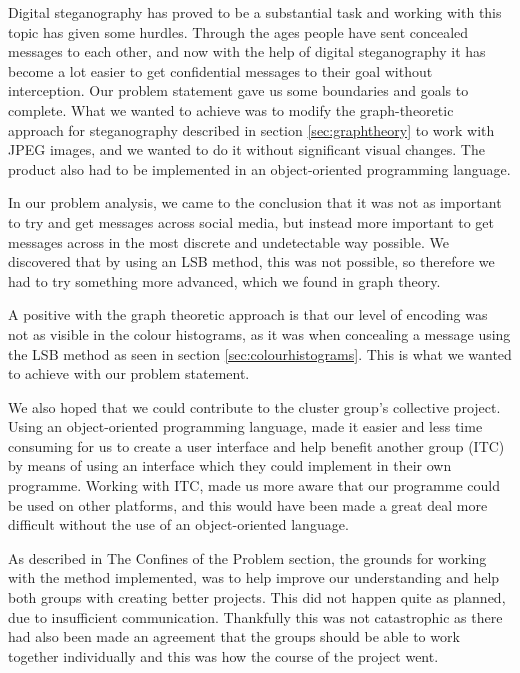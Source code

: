 Digital steganography has proved to be a substantial task and working with this topic has given some hurdles. 
Through the ages people have sent concealed messages to each other, and now with the help of digital steganography it has become a lot easier to get confidential messages to their goal without interception.
Our problem statement gave us some boundaries and goals to complete. What we wanted to achieve was to modify the graph-theoretic approach for steganography described in section \ref{sec:graphtheory} to work with JPEG images, and we wanted to do it without significant visual changes.
The product also had to be implemented in an object-oriented programming language.

In our problem analysis, we came to the conclusion that it was not as important to try and get messages across social media, but instead more important to get messages across in the most discrete and undetectable way possible. 
We discovered that by using an LSB method, this was not possible, so therefore we had to try something more advanced, which we found in graph theory.

A positive with the graph theoretic approach is that our level of encoding was not as visible in the colour histograms, as it was when concealing a message using the LSB method as seen in section \ref{sec:colourhistograms}. This is what we wanted to achieve with our problem statement.

We also hoped that we could contribute to the cluster group's collective project.
Using an object-oriented programming language, made it easier and less time consuming for us to create a user interface and help benefit another group (ITC) by means of using an interface which they could implement in their own programme. 
Working with ITC, made us more aware that our programme could be used on other platforms, and this would have been made a great deal more difficult without the use of an object-oriented language.

As described in The Confines of the Problem section, the grounds for working with the method implemented, was to help improve our understanding and help both groups with creating better projects. 
This did not happen quite as planned, due to insufficient communication. Thankfully this was not catastrophic as there had also been made an agreement that the groups should be able to work together individually and this was how the course of the project went.

